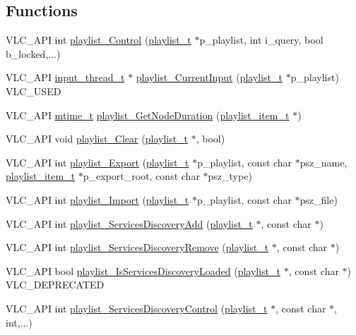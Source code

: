 \subsection*{Functions}
\begin{DoxyCompactItemize}
\item 
V\+L\+C\+\_\+\+A\+PI int \hyperlink{group__vlc__playlist_ga3f0e893ab6167f3c85067330cb5f2b78}{playlist\+\_\+\+Control} (\hyperlink{structplaylist__t}{playlist\+\_\+t} $\ast$p\+\_\+playlist, int i\+\_\+query, bool b\+\_\+locked,...)
\item 
V\+L\+C\+\_\+\+A\+PI \hyperlink{structinput__thread__t}{input\+\_\+thread\+\_\+t} $\ast$ \hyperlink{group__vlc__playlist_gae2e41a3f7512cc5e341b2fa303a6dccf}{playlist\+\_\+\+Current\+Input} (\hyperlink{structplaylist__t}{playlist\+\_\+t} $\ast$p\+\_\+playlist) V\+L\+C\+\_\+\+U\+S\+ED
\item 
V\+L\+C\+\_\+\+A\+PI \hyperlink{vlc__common_8h_a996e47c5ea061215703c26738351279e}{mtime\+\_\+t} \hyperlink{group__vlc__playlist_gabd5adb1acdd870e7cbab434262108036}{playlist\+\_\+\+Get\+Node\+Duration} (\hyperlink{structplaylist__item__t}{playlist\+\_\+item\+\_\+t} $\ast$)
\item 
V\+L\+C\+\_\+\+A\+PI void \hyperlink{group__vlc__playlist_ga08a4c79407d2cde206127095aa7baa13}{playlist\+\_\+\+Clear} (\hyperlink{structplaylist__t}{playlist\+\_\+t} $\ast$, bool)
\item 
V\+L\+C\+\_\+\+A\+PI int \hyperlink{group__vlc__playlist_ga19fc398fcc814e32f514364d168b29da}{playlist\+\_\+\+Export} (\hyperlink{structplaylist__t}{playlist\+\_\+t} $\ast$p\+\_\+playlist, const char $\ast$psz\+\_\+name, \hyperlink{structplaylist__item__t}{playlist\+\_\+item\+\_\+t} $\ast$p\+\_\+export\+\_\+root, const char $\ast$psz\+\_\+type)
\item 
V\+L\+C\+\_\+\+A\+PI int \hyperlink{group__vlc__playlist_ga3433d0da5875ba97b0e42d6fd5d947fc}{playlist\+\_\+\+Import} (\hyperlink{structplaylist__t}{playlist\+\_\+t} $\ast$p\+\_\+playlist, const char $\ast$psz\+\_\+file)
\item 
V\+L\+C\+\_\+\+A\+PI int \hyperlink{group__vlc__playlist_gafcfd2f1e287c4ca7a3356a1f4875c88d}{playlist\+\_\+\+Services\+Discovery\+Add} (\hyperlink{structplaylist__t}{playlist\+\_\+t} $\ast$, const char $\ast$)
\item 
V\+L\+C\+\_\+\+A\+PI int \hyperlink{group__vlc__playlist_ga91ffcf04d843ab08f7a460296d37595d}{playlist\+\_\+\+Services\+Discovery\+Remove} (\hyperlink{structplaylist__t}{playlist\+\_\+t} $\ast$, const char $\ast$)
\item 
V\+L\+C\+\_\+\+A\+PI bool \hyperlink{group__vlc__playlist_ga2cb2591cf33c213b064947677794ec67}{playlist\+\_\+\+Is\+Services\+Discovery\+Loaded} (\hyperlink{structplaylist__t}{playlist\+\_\+t} $\ast$, const char $\ast$) V\+L\+C\+\_\+\+D\+E\+P\+R\+E\+C\+A\+T\+ED
\item 
V\+L\+C\+\_\+\+A\+PI int \hyperlink{group__vlc__playlist_gae68b5f21bde9697bf08ff9b3d0353105}{playlist\+\_\+\+Services\+Discovery\+Control} (\hyperlink{structplaylist__t}{playlist\+\_\+t} $\ast$, const char $\ast$, int,...)
\end{DoxyCompactItemize}


